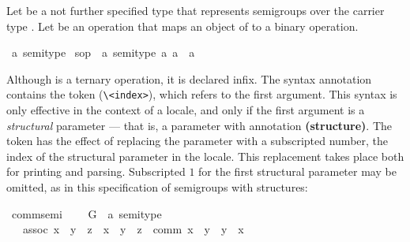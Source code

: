 \begin{isabellebody}
\begin{isamarkuptext}
  Let  be a not further specified type that
  represents semigroups over the carrier type .  Let  be an operation that maps an object of  to
  a binary operation.%
\end{isamarkuptext}%
\isamarkuptrue%
\ {\isacharprime}a\ semi{\isacharunderscore}type\isanewline
\isamarkupfalse%
\ s{\isacharunderscore}op\ {\isacharcolon}{\isacharcolon}\ {\isachardoublequote}{\isacharbrackleft}{\isacharprime}a\ semi{\isacharunderscore}type{\isacharcomma}\ {\isacharprime}a{\isacharcomma}\ {\isacharprime}a{\isacharbrackright}\ {\isasymRightarrow}\ {\isacharprime}a{\isachardoublequote}\ {\isacharparenleft}\ {\isachardoublequote}{\isasymstar}{\isasymindex}{\isachardoublequote}\ {}{}{\isacharparenright}\isamarkupfalse%
%
\begin{isamarkuptext}%
Although  is a ternary operation, it is declared
  infix.  The syntax annotation contains the token  \isa{{\isasymindex}}
  (\verb.\<index>.), which refers to the first argument.  This syntax is only
  effective in the context of a locale, and only if the first argument
  is a
  \emph{structural} parameter --- that is, a parameter with annotation
  \textbf{(structure)}.  The token has the effect of replacing the
  parameter with a subscripted number, the index of the structural
  parameter in the locale.  This replacement takes place both for
  printing and
  parsing.  Subscripted $1$ for the first structural
  parameter may be omitted, as in this specification of semigroups with
  structures:%
\end{isamarkuptext}%
\isamarkuptrue%
\ comm{\isacharunderscore}semi{\isacharprime}\ {\isacharequal}\isanewline
\ \ \ G\ {\isacharcolon}{\isacharcolon}\ {\isachardoublequote}{\isacharprime}a\ semi{\isacharunderscore}type{\isachardoublequote}\ {\isacharparenleft}\isanewline
\ \ \ assoc{\isacharcolon}\ {\isachardoublequote}{\isacharparenleft}x\ {\isasymstar}\ y{\isacharparenright}\ {\isasymstar}\ z\ {\isacharequal}\ x\ {\isasymstar}\ {\isacharparenleft}y\ {\isasymstar}\ z{\isacharparenright}{\isachardoublequote}\ \ comm{\isacharcolon}\ {\isachardoublequote}x\ {\isasymstar}\ y\ {\isacharequal}\ y\ {\isasymstar}\ x{\isachardoublequote}\isamarkupfalse%
%
\begin{isamarkuptext}%

\end{isamarkuptext}
\end{isabellebody}
